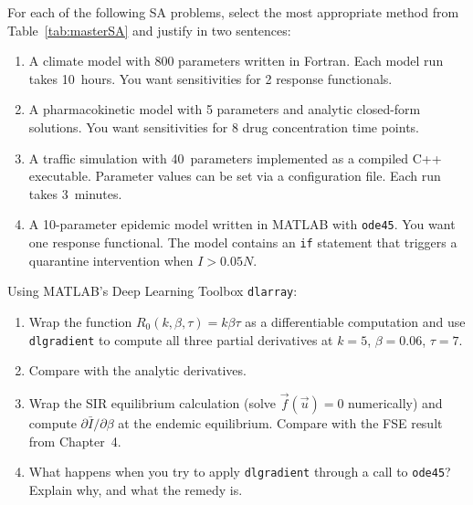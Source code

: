 \begin{exercise}[\bloom{L4}]
\label{ex:ch7:decisiontable}
For each of the following SA problems, select the most appropriate
method from Table~\ref{tab:masterSA} and justify in two sentences:
\begin{enumerate}[label=(\alph*)]
  \item A climate model with 800 parameters written in Fortran.
        Each model run takes 10~hours. You want sensitivities for
        2 response functionals.
  \item A pharmacokinetic model with 5 parameters and analytic
        closed-form solutions. You want sensitivities for 8 drug
        concentration time points.
  \item A traffic simulation with 40~parameters implemented as a
        compiled C++ executable. Parameter values can be set via
        a configuration file. Each run takes 3~minutes.
  \item A 10-parameter epidemic model written in MATLAB with
        \texttt{ode45}. You want one response functional.
        The model contains an \texttt{if} statement that triggers
        a quarantine intervention when $I > 0.05N$.
\end{enumerate}
\end{exercise}

\begin{exercise}[\bloom{L4}]
\label{ex:ch7:dlarray}
Using MATLAB's Deep Learning Toolbox \texttt{dlarray}:
\begin{enumerate}[label=(\alph*)]
  \item Wrap the function $R_0(k, \beta, \tau) = k\beta\tau$ as a
        differentiable computation and use \texttt{dlgradient} to compute
        all three partial derivatives at $k=5$, $\beta=0.06$, $\tau=7$.
  \item Compare with the analytic derivatives.
  \item Wrap the SIR equilibrium calculation (solve $\vec{f}(\vec{u}) = 0$
        numerically) and compute $\partial\bar{I}/\partial\beta$ at the
        endemic equilibrium. Compare with the FSE result from Chapter~4.
  \item What happens when you try to apply \texttt{dlgradient} through
        a call to \texttt{ode45}? Explain why, and what the remedy is.
\end{enumerate}
\end{exercise}

